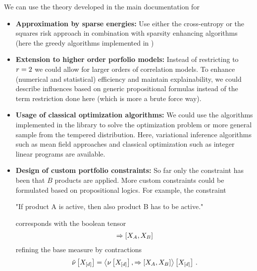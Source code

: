 \documentclass[aps,onecolumn,nofootinbib,pra]{article}
\begin{document}
    We can use the theory developed in the main documentation for
    \begin{itemize}
        \item \textbf{Approximation by sparse energies:} Use either the cross-entropy or the squares risk approach in combination with sparsity enhancing algorithms (here the greedy algorithms implemented in \tnreason)
        \item \textbf{Extension to higher order porfolio models:} Instead of restricting to $r=2$ we could allow for larger orders of correlation models.
        To enhance (numerical and statistical) efficiency and maintain explainability, we could describe influences based on generic propositional formulas instead of the term restriction done here (which is more a brute force way).
        \item \textbf{Usage of classical optimization algorithms:} We could use the algorithms implemented in the \tnreason library to solve the optimization problem or more general sample from the tempered distribution.
        Here, variational inference algorithms such as mean field approaches and classical optimization such as integer linear programs are available.
        \item \textbf{Design of custom portfolio constraints:} So far only the constraint has been that $B$ products are applied.
        More custom constraints could be formulated based on propositional logics.
        For example, the constraint
        \begin{center}
            "If product A is active, then also product B has to be active."
        \end{center}
        corresponds with the boolean tensor
        \begin{align*}
            \Rightarrow \left[X_{A},X_{B}\right]
        \end{align*}
        refining the base measure by contractions
        \begin{align*}
            \tilde{\nu}\left[X_{[d]}\right] = \left\langle \nu\left[X_{[d]}\right],\Rightarrow\left[X_{A},X_{B}\right]\right\rangle \left[ X_{[d]} \right] \, .
        \end{align*}
    \end{itemize}
\end{document}
